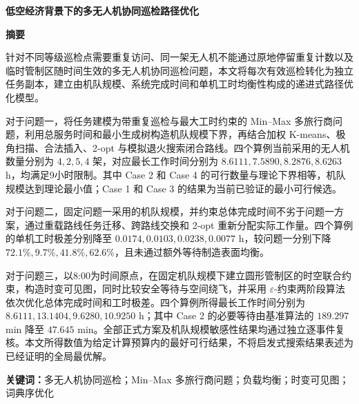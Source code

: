 \documentclass[UTF8,a4paper,12pt]{ctexart}
\numberwithin{equation}{section}
\newcommand{\PaperTitle}{低空经济背景下的多无人机协同巡检路径优化}
\numberwithin{equation}{section}
\begin{document}
\setcounter{page}{1}

\pagestyle{frontmatter}
\thispagestyle{frontmatter}

\begin{center}
  \vspace*{0.7cm}
  {\bfseries\fontsize{20pt}{28pt}\selectfont \PaperTitle\par}
  \vspace{0.9cm}
  {\bfseries\fontsize{16pt}{22pt}\selectfont 摘\quad 要\par}
\end{center}

\vspace{0.35cm}

针对不同等级巡检点需要重复访问、同一架无人机不能通过原地停留重复计数以及临时管制区随时间生效的多无人机协同巡检问题，本文将每次有效巡检转化为独立任务副本，建立由机队规模、系统完成时间和单机工时均衡性构成的递进式路径优化模型。

对于问题一，将任务建模为带重复巡检与最大工时约束的 Min--Max 多旅行商问题，利用总服务时间和最小生成树构造机队规模下界，再结合加权 K-means、极角扫描、合法插入、2-opt 与模拟退火搜索闭合路线。四个算例当前采用的无人机数量分别为 $4,2,5,4$ 架，对应最长工作时间分别为 $8.6111,7.5890,8.2876,8.6263$ h，均满足9小时限制。其中 Case 2 和 Case 4 的可行数量与理论下界相等，机队规模达到理论最小值；Case 1 和 Case 3 的结果为当前已验证的最小可行候选。

对于问题二，固定问题一采用的机队规模，并约束总体完成时间不劣于问题一方案，通过重载路线任务迁移、跨路线交换和 2-opt 重新分配实际工作量。四个算例的单机工时极差分别降至 $0.0174,0.0103,0.0238,0.0077$ h，较问题一分别下降 $72.1\%,9.7\%,41.8\%,62.6\%$，且未通过额外等待制造表面均衡。

对于问题三，以8:00为时间原点，在固定机队规模下建立圆形管制区的时空联合约束，构造时变可见图，同时比较安全等待与空间绕飞，并采用 $\varepsilon$-约束两阶段算法依次优化总体完成时间和工时极差。四个算例所得最长工作时间分别为 $8.6111,13.1404,9.6280,10.9250$ h；其中 Case 2 的必要等待由基准算法的 $189.297$ min 降至 $47.645$ min。全部正式方案及机队规模敏感性结果均通过独立逐事件复核。本文所得数值为给定计算预算内的最好可行结果，不将启发式搜索结果表述为已经证明的全局最优解。

\vspace{0.45cm}
\noindent\textbf{关键词：}多无人机协同巡检；Min--Max 多旅行商问题；负载均衡；时变可见图；词典序优化
\vspace{0.45cm}
\end{document}
